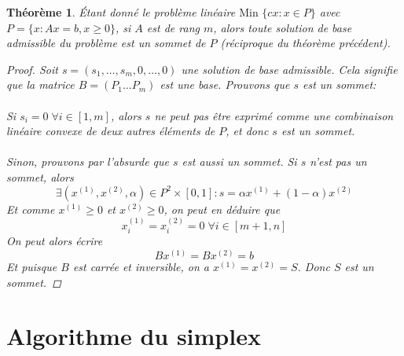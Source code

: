\documentclass[a4paper]{report}
\theoremstyle{definition}
\theoremstyle{remark}
\theoremstyle{plain}
\newtheorem{theorem}{Théorème}
\begin{document}
\begin{theorem}
Étant donné le problème linéaire \(\text{Min }\{cx:x\in P\}\) avec
\(P = \{x:Ax=b,x\ge 0\}\), si \(A\) est de rang \(m\), alors toute solution de
base admissible du problème est un sommet de \(P\) (réciproque du théorème
précédent).
\begin{proof}
Soit \(s=(s_1,\dots,s_m,0,\dots,0)\) une solution de base admissible. Cela
signifie que la matrice \(B=(P_1\dots P_m)\) est une base. Prouvons que \(s\)
est un sommet:
\paragraph{}
Si \(s_i=0\;\forall i\in[1,m]\), alors \(s\) ne peut pas être exprimé comme une
combinaison linéaire convexe de deux autres éléments de \(P\), et donc \(s\) est
un sommet.
\paragraph{}
Sinon, prouvons par l'absurde que \(s\) est aussi un sommet. Si \(s\) n'est pas
un sommet, alors
\[\exists (x^{(1)},x^{(2)},\alpha)\in P^2\times[0,1]:s=\alpha x^{(1)}+(1-\alpha)x^{(2)}\]
Et comme \(x^{(1)}\ge0\) et \(x^{(2)}\ge0\), on peut en déduire que
\[x^{(1)}_i=x^{(2)}_i=0\;\forall i\in[m+1,n]\]
On peut alors écrire
\[Bx^{(1)}=Bx^{(2)}=b\]
Et puisque \(B\) est carrée et inversible, on a \(x^{(1)}=x^{(2)}=S\).
Donc \(S\) est un sommet.
\end{proof}
\end{theorem}

\section{Algorithme du simplex}
\end{document}
